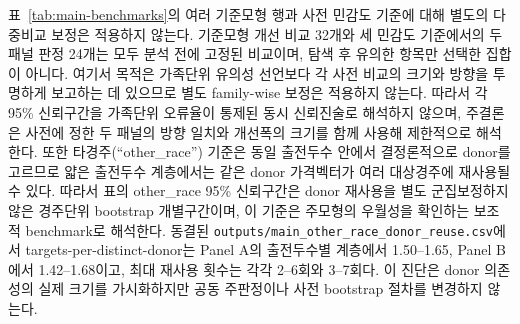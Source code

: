 \begin{table}[htbp]
\centering
\caption{기준모형 대비 TV 개선폭. 단승--Harville 행은 Harville의 입력 자체가
단승 정규화 가격이어서 구성상 항등식이며, 실질적인 기준모형 우위 검정으로
해석하지 않는다. Panel B의 Harville 행들은 게시 단승 점벡터에서 만든
퇴화한 점예측에 조건부이며 다른 가격집합 기준과 완전히 대칭적인 부분식별 비교가 아니다.
각 95\% 신뢰구간은 개별 구간이며 다중비교 보정을 적용하지 않았다.
표의 $\dagger$는 같은 donor가 여러 대상경주에 재사용되지만 해당 신뢰구간에는
donor 군집보정이 적용되지 않은 보조 기준모형을 뜻한다.}
\label{tab:main-benchmarks}
\resizebox{\textwidth}{!}{}
\end{table}

표~\ref{tab:main-benchmarks}의 여러 기준모형 행과 사전 민감도 기준에 대해
별도의 다중비교 보정은 적용하지 않는다. 기준모형 개선 비교 32개와 세 민감도
기준에서의 두 패널 판정 24개는 모두 분석 전에 고정된 비교이며, 탐색 후 유의한
항목만 선택한 집합이 아니다. 여기서 목적은 가족단위 유의성 선언보다 각 사전 비교의
크기와 방향을 투명하게 보고하는 데 있으므로 별도 family-wise 보정은 적용하지 않는다.
따라서 각 95\% 신뢰구간을 가족단위 오류율이 통제된 동시 신뢰진술로 해석하지 않으며,
주결론은 사전에 정한 두 패널의 방향 일치와 개선폭의 크기를 함께 사용해
제한적으로 해석한다. 또한 타경주(``other\_race'') 기준은 동일 출전두수 안에서
결정론적으로 donor를 고르므로 얇은 출전두수 계층에서는 같은 donor 가격벡터가
여러 대상경주에 재사용될 수 있다. 따라서 표의 other\_race 95\% 신뢰구간은 donor
재사용을 별도 군집보정하지 않은 경주단위 bootstrap 개별구간이며, 이 기준은 주모형의
우월성을 확인하는 보조적 benchmark로 해석한다. 동결된
\texttt{outputs/main\_other\_race\_donor\_reuse.csv}에서 targets-per-distinct-donor는
Panel A의 출전두수별 계층에서 1.50--1.65, Panel B에서 1.42--1.68이고,
최대 재사용 횟수는 각각 2--6회와 3--7회다. 이 진단은 donor 의존성의 실제 크기를
가시화하지만 공동 주판정이나 사전 bootstrap 절차를 변경하지 않는다.

\begin{table}[htbp]
\centering
\caption{Panel A의 쌍승--복승 순서정보 비교. 차이 중앙값은 짝지은 경주별
개선폭 차이의 중앙값이므로, 표에 따로 제시한 두 개선폭 중앙값의 산술적 차이와
일치할 필요가 없다.}
\label{tab:main-order-a}
\resizebox{0.86\textwidth}{!}{}
\end{table}

\begin{table}[htbp]
\centering
\caption{Panel B의 쌍승--복승 순서정보 부분식별}
\label{tab:main-order-b}
\resizebox{0.96\textwidth}{!}{}
\end{table}

